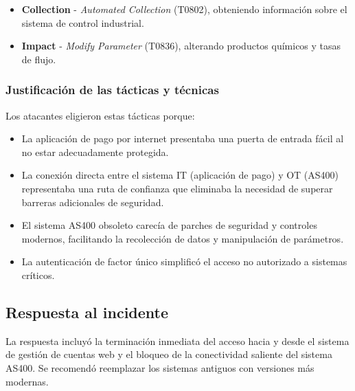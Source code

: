 \begin{paracol}{2}
\begin{itemize}
    \item \textbf{Collection} - \textit{Automated Collection} (T0802), obteniendo información sobre el sistema de control industrial.
    
    \item \textbf{Impact} - \textit{Modify Parameter} (T0836), alterando productos químicos y tasas de flujo.
\end{itemize}

\subsubsection{Justificación de las tácticas y técnicas}
Los atacantes eligieron estas tácticas porque:

\begin{itemize}
    \item La aplicación de pago por internet presentaba una puerta de entrada fácil al no estar adecuadamente protegida.
    
    \item La conexión directa entre el sistema \textsc{IT} (aplicación de pago) y \textsc{OT} (\textsc{AS400}) representaba una ruta de confianza que eliminaba la necesidad de superar barreras adicionales de seguridad.
    
    \item El sistema \textsc{AS400} obsoleto carecía de parches de seguridad y controles modernos, facilitando la recolección de datos y manipulación de parámetros.
    
    \item La autenticación de factor único simplificó el acceso no autorizado a sistemas críticos.
\end{itemize}
    \colfill
\end{paracol}


\subsection{Respuesta al incidente}

La respuesta incluyó la terminación inmediata del acceso hacia y desde el sistema de gestión de cuentas web y el bloqueo de la conectividad saliente del sistema \textsc{AS400}. Se recomendó reemplazar los sistemas antiguos con versiones más modernas.

